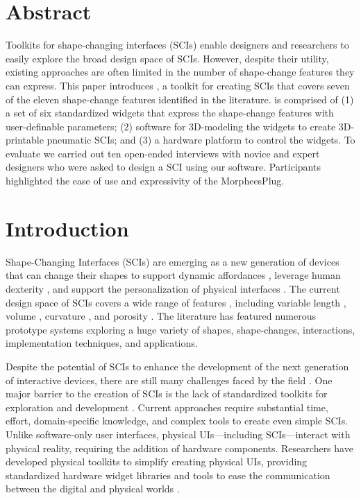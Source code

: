   \section{Abstract}
    Toolkits for shape-changing interfaces (SCIs) enable designers and researchers
    to easily explore the broad design space of SCIs. However, despite their
    utility, existing approaches are often limited in the number of shape-change
    features they can express. This paper introduces \mp, a toolkit for creating
    SCIs that covers seven of the eleven shape-change features identified in the
    literature. \mp is comprised of (1) a set of six standardized widgets that
    express the shape-change features with user-definable parameters; (2) software
    for 3D-modeling the widgets to create 3D-printable pneumatic SCIs; and (3) a
    hardware platform to control the widgets. To evaluate \mp we carried out ten
    open-ended interviews with novice and expert designers who were asked to
    design a SCI using our software. Participants highlighted the ease of use and
    expressivity of the MorpheesPlug.

  \section{Introduction}
    Shape-Changing Interfaces (SCIs) are emerging as a new generation of
    devices that can change their shapes to support dynamic affordances
    \cite{Follmer:2013}, leverage human dexterity \cite{6926382},
    and support the personalization of physical interfaces
    \cite{Kim:2008}. The current design space of SCIs covers a
    wide range of features \cite{10.1145/3173574.3174193}, including variable
    length \cite{Follmer:2013}, volume
    \cite{10.1145/1357054.1357090}, curvature \cite{Yao:2013}, and porosity
    \cite{10.1145/1517664.1517671}. The literature has featured numerous
    prototype systems exploring a huge variety of shapes, shape-changes,
    interactions, implementation techniques, and applications. 
    
    Despite the potential of SCIs to enhance the development of the
    next generation of interactive devices, there are still many challenges
    faced by the field \cite{10.1145/3173574.3173873}. One major barrier to
    the creation of SCIs is the lack of standardized toolkits for
    exploration and development \cite{10.1145/3173574.3173873}. Current
    approaches require substantial time, effort, domain-specific knowledge,
    and complex tools to create even simple SCIs. Unlike software-only
    user interfaces, physical UIs---including SCIs---interact with
    physical reality, requiring the addition of hardware components.
    Researchers have developed physical toolkits to simplify creating physical
    UIs, providing standardized hardware widget libraries
    \cite{Greenberg:2001,Bdeir:2009kz} and tools to ease the communication
    between the digital and physical worlds \cite{Hartmann:2007p4338}.
    
